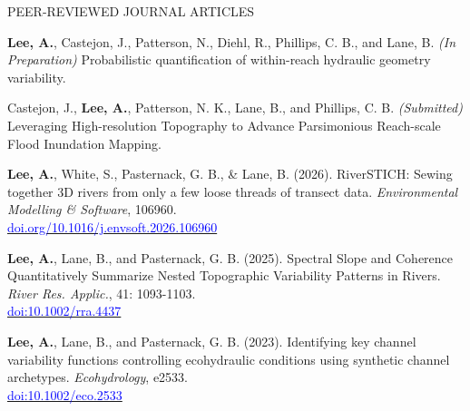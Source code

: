 \documentclass{resume_anzy} %
\begin{document}
%
%
%
%
%
%
%


\begin{rSection}{PEER-REVIEWED JOURNAL ARTICLES}
\vspace{-2.5mm}


\item [1] \textbf{Lee, A.}, Castejon, J., Patterson, N., Diehl, R., Phillips, C. B., and Lane, B. \textit{(In Preparation)} Probabilistic quantification of within-reach hydraulic geometry variability. 

\item [2] Castejon, J., \textbf{Lee, A.}, Patterson, N. K., Lane, B., and Phillips, C. B. \textit{(Submitted)} Leveraging High-resolution Topography to Advance Parsimonious Reach-scale Flood Inundation Mapping. 

\item [3] \textbf{Lee, A.}, White, S., Pasternack, G. B., \& Lane, B. (2026). RiverSTICH: Sewing together 3D rivers from only a few loose threads of transect data. \textit{Environmental Modelling \& Software}, 106960. \\ \href{https://doi.org/10.1016/j.envsoft.2026.106960}{\textcolor{blue}{doi.org/10.1016/j.envsoft.2026.106960}}

\item [4] \textbf{Lee, A.}, Lane, B., and Pasternack, G. B. (2025). Spectral Slope and Coherence Quantitatively Summarize Nested Topographic Variability Patterns in Rivers. \textit{River Res. Applic.}, 41: 1093-1103. \\ \href{https://doi.org/10.1002/rra.4437}{\textcolor{blue}{\textcolor{blue}{doi:10.1002/rra.4437}}} 

\item [5] \textbf{Lee, A.}, Lane, B., and Pasternack, G. B. (2023). Identifying key channel variability functions controlling ecohydraulic conditions using synthetic channel archetypes.  \textit{Ecohydrology}, e2533. \\ \href{https://doi.org/10.1002/eco.2533}{\textcolor{blue}{doi:10.1002/eco.2533}}


\end{rSection}
\end{document}

